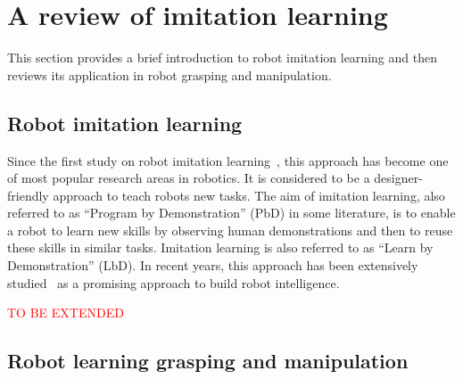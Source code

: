 \section{A review of imitation learning}
\label{cha2:sec2}

This section provides a brief introduction to robot imitation learning and then reviews its application in robot grasping and manipulation.

\subsection{Robot imitation learning}
\label{cha2:sec2:learning}
Since the first study on robot imitation learning~\citep{friedrich1996robot}, this approach has become one of most popular research areas in robotics. It is considered to be a designer-friendly approach to teach robots new tasks. The aim of imitation learning, also referred to as ``Program by Demonstration'' (PbD) in some literature, is to enable a robot to learn new skills by observing human demonstrations and then to reuse these skills in similar tasks. Imitation learning is also referred to as ``Learn by Demonstration'' (LbD). In recent years, this approach has been extensively studied~\citep{calinon2007learning,calinon2008robot,dillmann2004teaching,kulic2012incremental} as a promising approach to build robot intelligence.

\textcolor{red}{TO BE EXTENDED}

\subsection{Robot learning grasping and manipulation }
\label{cha2:sec2:grasping-leaning}


